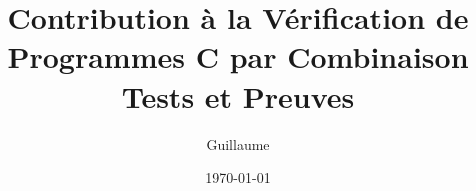 \documentclass[a4paper,11pt]{report}
\begin{document}
 
\title{Contribution à la Vérification de Programmes C
  par Combinaison Tests et Preuves}
\author{Guillaume }
\date{\today}
 
\maketitle


\tableofcontents
\listoffigures







\begin{scriptsize}


\end{scriptsize}
\end{document}
